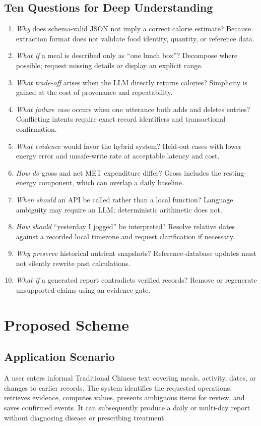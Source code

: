 \documentclass[journal,10pt]{IEEEtran}
\begin{document}
\subsection{Ten Questions for Deep Understanding}
\begin{enumerate}
\item \emph{Why} does schema-valid JSON not imply a correct calorie estimate? Because extraction format does not validate food identity, quantity, or reference data.
\item \emph{What if} a meal is described only as ``one lunch box''? Decompose where possible; request missing details or display an explicit range.
\item \emph{What trade-off} arises when the LLM directly returns calories? Simplicity is gained at the cost of provenance and repeatability.
\item \emph{What failure case} occurs when one utterance both adds and deletes entries? Conflicting intents require exact record identifiers and transactional confirmation.
\item \emph{What evidence} would favor the hybrid system? Held-out cases with lower energy error and unsafe-write rate at acceptable latency and cost.
\item \emph{How do} gross and net MET expenditure differ? Gross includes the resting-energy component, which can overlap a daily baseline.
\item \emph{When should} an API be called rather than a local function? Language ambiguity may require an LLM; deterministic arithmetic does not.
\item \emph{How should} ``yesterday I jogged'' be interpreted? Resolve relative dates against a recorded local timezone and request clarification if necessary.
\item \emph{Why preserve} historical nutrient snapshots? Reference-database updates must not silently rewrite past calculations.
\item \emph{What if} a generated report contradicts verified records? Remove or regenerate unsupported claims using an evidence gate.
\end{enumerate}

\section{Proposed Scheme}
\subsection{Application Scenario}
A user enters informal Traditional Chinese text covering meals, activity, dates, or changes to earlier records. The system identifies the requested operations, retrieves evidence, computes values, presents ambiguous items for review, and saves confirmed events. It can subsequently produce a daily or multi-day report without diagnosing disease or prescribing treatment.
\end{document}
